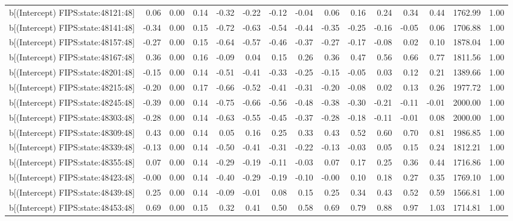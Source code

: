 \begin{table}[ht]
\begin{tabular}{rrrrrrrrrrrrrrr}
  b[(Intercept) FIPS:state:48121:48] & 0.06 & 0.00 & 0.14 & -0.32 & -0.22 & -0.12 & -0.04 & 0.06 & 0.16 & 0.24 & 0.34 & 0.44 & 1762.99 & 1.00 \\ 
  b[(Intercept) FIPS:state:48141:48] & -0.34 & 0.00 & 0.15 & -0.72 & -0.63 & -0.54 & -0.44 & -0.35 & -0.25 & -0.16 & -0.05 & 0.06 & 1706.88 & 1.00 \\ 
  b[(Intercept) FIPS:state:48157:48] & -0.27 & 0.00 & 0.15 & -0.64 & -0.57 & -0.46 & -0.37 & -0.27 & -0.17 & -0.08 & 0.02 & 0.10 & 1878.04 & 1.00 \\ 
  b[(Intercept) FIPS:state:48167:48] & 0.36 & 0.00 & 0.16 & -0.09 & 0.04 & 0.15 & 0.26 & 0.36 & 0.47 & 0.56 & 0.66 & 0.77 & 1811.56 & 1.00 \\ 
  b[(Intercept) FIPS:state:48201:48] & -0.15 & 0.00 & 0.14 & -0.51 & -0.41 & -0.33 & -0.25 & -0.15 & -0.05 & 0.03 & 0.12 & 0.21 & 1389.66 & 1.00 \\ 
  b[(Intercept) FIPS:state:48215:48] & -0.20 & 0.00 & 0.17 & -0.66 & -0.52 & -0.41 & -0.31 & -0.20 & -0.08 & 0.02 & 0.13 & 0.26 & 1977.72 & 1.00 \\ 
  b[(Intercept) FIPS:state:48245:48] & -0.39 & 0.00 & 0.14 & -0.75 & -0.66 & -0.56 & -0.48 & -0.38 & -0.30 & -0.21 & -0.11 & -0.01 & 2000.00 & 1.00 \\ 
  b[(Intercept) FIPS:state:48303:48] & -0.28 & 0.00 & 0.14 & -0.63 & -0.55 & -0.45 & -0.37 & -0.28 & -0.18 & -0.11 & -0.01 & 0.08 & 2000.00 & 1.00 \\ 
  b[(Intercept) FIPS:state:48309:48] & 0.43 & 0.00 & 0.14 & 0.05 & 0.16 & 0.25 & 0.33 & 0.43 & 0.52 & 0.60 & 0.70 & 0.81 & 1986.85 & 1.00 \\ 
  b[(Intercept) FIPS:state:48339:48] & -0.13 & 0.00 & 0.14 & -0.50 & -0.41 & -0.31 & -0.22 & -0.13 & -0.03 & 0.05 & 0.15 & 0.24 & 1812.21 & 1.00 \\ 
  b[(Intercept) FIPS:state:48355:48] & 0.07 & 0.00 & 0.14 & -0.29 & -0.19 & -0.11 & -0.03 & 0.07 & 0.17 & 0.25 & 0.36 & 0.44 & 1716.86 & 1.00 \\ 
  b[(Intercept) FIPS:state:48423:48] & -0.00 & 0.00 & 0.14 & -0.40 & -0.29 & -0.19 & -0.10 & -0.00 & 0.10 & 0.18 & 0.27 & 0.35 & 1769.10 & 1.00 \\ 
  b[(Intercept) FIPS:state:48439:48] & 0.25 & 0.00 & 0.14 & -0.09 & -0.01 & 0.08 & 0.15 & 0.25 & 0.34 & 0.43 & 0.52 & 0.59 & 1566.81 & 1.00 \\ 
  b[(Intercept) FIPS:state:48453:48] & 0.69 & 0.00 & 0.15 & 0.32 & 0.41 & 0.50 & 0.58 & 0.69 & 0.79 & 0.88 & 0.97 & 1.03 & 1714.81 & 1.00 \\ 

\end{tabular}
\end{table}
